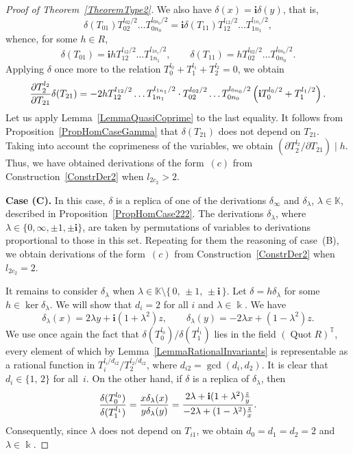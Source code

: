 \documentclass[a4paper,reqno,12pt]{amsart}
\theoremstyle{plain}
\theoremstyle{definition}
\theoremstyle{plain}
\theoremstyle{remark}
\DeclareMathOperator{\Quot}{Quot}
\newcommand{\KK}{\mathbb K}
\newcommand{\TT}{\mathbb{T}}
\newcommand{\ii}{\mathbf{i}}
\begin{document}
\begin{proof}[Proof of Theorem~\ref{TheoremType2}]
    We also have $\delta(x) = \ii\delta(y)$, that is, $$\delta(T_{01}){T_{02}^{l_{02}/2}\dots T_{0n_0}^{l_{0n_0}/2}}=\ii\delta(T_{11}){T_{12}^{l_{12}/2}\dots T_{1n_1}^{l_{1n_1}/2}},$$ whence, for some $h\in R$,
    $$
    \delta(T_{01})=\ii h{T_{12}^{l_{12}/2}\dots T_{1n_1}^{l_{1n_1}/2}}, \qquad \delta(T_{11}) = h{T_{02}^{l_{02}/2}\dots T_{0n_0}^{l_{0n_0}/2}}.
    $$
    Applying $\delta$ once more to the relation $T_0^{l_0}+T_1^{l_1}+T_2^{l_2}=0$, we obtain
    $$
    {\partial T_2^{l_2}\over \partial T_{21}}\delta(T_{21}) = -2h{T_{12}^{l_{12}/2}\dots T_{1n_1}^{l_{1n_1}/2}} \cdot {T_{02}^{l_{02}/2}\dots T_{0n_0}^{l_{0n_0}/2}} \left( \ii{T_0^{l_0/2}} + {T_1^{l_1/2}} \right).
    $$
    Let us apply Lemma~\ref{LemmaQuasiCoprime} to the last equality. It follows from Proposition~\ref{PropHomCaseGamma} that $\delta(T_{21})$ does not depend on $T_{21}$. Taking into account the coprimeness of the variables, we obtain $\left(\partial T_2^{l_2}/ \partial T_{21}\right)\mid h$.
    Thus, we have obtained derivations of the form~$(c)$ from Construction~\ref{ConstrDer2} when $l_{2c_2}>2$.

    \textbf{Case (C).} In this case, $\delta$ is a replica of one of the derivations $\delta_\infty$ and $\delta_\lambda$, $\lambda\in\KK$, described in Proposition~\ref{PropHomCase222}. The derivations $\delta_\lambda$, where $\lambda\in\{0,\infty,\pm1,\pm\ii\}$, are taken by permutations of variables to derivations proportional to those in this set. Repeating for them the reasoning of case~(B), we obtain derivations of the form~$(c)$ from Construction~\ref{ConstrDer2} when $l_{2c_2}=2$.

    It remains to consider $\delta_\lambda$ when $\lambda\in\KK\setminus \{\,0,\,\pm1,\,\pm\ii\,\}$. Let $\delta=h\delta_\lambda$ for some $h\in\ker\delta_\lambda$. We will show that $d_i=2$ for all $i$ and $\lambda\in\Bbbk$. We have
    \begin{equation}\label{Eq5}
        \delta_\lambda(x)= 2\lambda y+\ii (1+\lambda^2)z,\qquad \delta_\lambda(y) = -2 \lambda x+(1-\lambda^2)z.
        \tag{6.4}
    \end{equation}
    We use once again the fact that $\delta(T_0^{l_0})/\delta(T_1^{l_1})$ lies in the field $(\Quot R)^{\TT}$, every element of which by Lemma~\ref{LemmaRationalInvariants} is representable as a rational function in $
    T_i^{l_i/d_{i2}}/ T_2^{l_2/d_{i2}}$, where $d_{i2}=\gcd(d_i, d_2)$. It is clear that $d_{i}\in\{1,\,2\}$ for all~$i$. On the other hand, if $\delta$ is a replica of $\delta_\lambda$, then
    $$
    {\delta(T_0^{l_0})\over\delta(T_1^{l_1})} = {x\delta_\lambda(x)\over y\delta_\lambda(y)} = {2\lambda + \ii(1+\lambda^2){z\over y}\over-2\lambda + (1-\lambda^2){z\over x}}.
    $$
    Consequently, since $\lambda$ does not depend on $T_{i1}$, we obtain $d_{0}=d_{1}=d_2=2$ and $\lambda\in\Bbbk$.


\end{proof}
\end{document}
